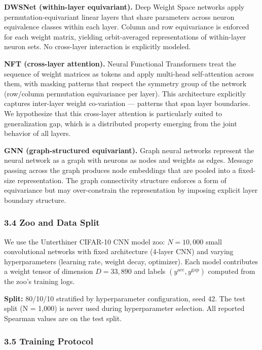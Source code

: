 \textbf{DWSNet (within-layer equivariant).} Deep Weight Space networks \citep{Navon2023Equivariant} apply
permutation-equivariant linear layers that share parameters across neuron equivalence classes within each
layer. Column and row equivariance is enforced for each weight matrix, yielding orbit-averaged
representations of within-layer neuron sets. No cross-layer interaction is explicitly modeled.

\textbf{NFT (cross-layer attention).} Neural Functional Transformers \citep{Zhou2023Neural} treat the sequence
of weight matrices as tokens and apply multi-head self-attention across them, with masking patterns that
respect the symmetry group of the network (row/column permutation equivariance per layer). This
architecture explicitly captures inter-layer weight co-variation --- patterns that span layer boundaries.
We hypothesize that this cross-layer attention is particularly suited to generalization gap, which is a
distributed property emerging from the joint behavior of all layers.

\textbf{GNN (graph-structured equivariant).} Graph neural networks \citep{Kofinas2024Graph} represent the
neural network as a graph with neurons as nodes and weights as edges. Message passing across the graph
produces node embeddings that are pooled into a fixed-size representation. The graph connectivity
structure enforces a form of equivariance but may over-constrain the representation by imposing explicit
layer boundary structure.

\subsubsection{3.4 Zoo and Data Split}

We use the Unterthiner CIFAR-10 CNN model zoo: $N = 10{,}000$ small convolutional networks with
fixed architecture (4-layer CNN) and varying hyperparameters (learning rate, weight decay, optimizer).
Each model contributes a weight tensor of dimension $D = 33{,}890$ and labels $(y^{\text{acc}}, y^{\text{gap}})$
computed from the zoo's training logs.

\textbf{Split:} 80/10/10 stratified by hyperparameter configuration, seed 42. The test split (N = 1,000) is
never used during hyperparameter selection. All reported Spearman values are on the test split.

\subsubsection{3.5 Training Protocol}

